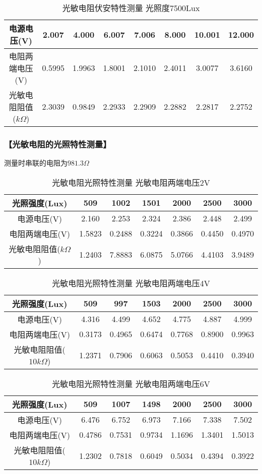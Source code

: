 \documentclass{ctexart}
\let\oldsubsubsection\subsubsection
\renewcommand{\subsubsection}[1]{\oldsubsubsection{\!\!\!\!\!\!【#1】}}
\begin{document}
\begin{table}[H]
  \centering
  \begin{tabular}{|c|c|c|c|c|c|c|c|}
    \hline
    电源电压(V) &2.007&4.000&6.007&7.006&8.000&10.001&12.000\\\hline
    电阻两端电压(V) &0.5995&1.9963&1.8001&2.1010&2.4011&3.0077&3.6160\\\hline
    光敏电阻阻值($k\Omega$)&2.3039&0.9849&2.2933&2.2909&2.2882&2.2817&2.2752 \\\hline
  \end{tabular}
  \caption{光敏电阻伏安特性测量 光照度7500Lux}
\end{table}

\subsubsection{光敏电阻的光照特性测量}

测量时串联的电阻为$981.3\Omega$

\begin{table}[H]
  \centering
  \begin{tabular}{|c|c|c|c|c|c|c|}
    \hline
    光照强度(Lux) &509&1002&1501&2000&2500&3000\\\hline
    电源电压(V) &2.160&2.253&2.324&2.386&2.448&2.499\\\hline
    电阻两端电压(V) &1.5823&0.2488&0.3224&0.3866&0.4450&0.4970\\\hline
    光敏电阻阻值($k\Omega$) & 1.2403&7.8883&6.0875&5.0766&4.4103&3.9489 \\\hline
  \end{tabular}
  \caption{光敏电阻光照特性测量 光敏电阻两端电压2V}
\end{table}

\begin{table}[H]
  \centering
  \begin{tabular}{|c|c|c|c|c|c|c|}
    \hline
    光照强度(Lux) &509&997&1503&2000&2500&3000\\\hline
    电源电压(V) &4.316&4.499&4.652&4.775&4.887&4.999\\\hline
    电阻两端电压(V) &0.3173&0.4965&0.6474&0.7768&0.8900&0.9963\\\hline
    光敏电阻阻值($10 k\Omega$) & 1.2371&0.7906&0.6063&0.5053&0.4410&0.3940\\\hline
  \end{tabular}
  \caption{光敏电阻光照特性测量 光敏电阻两端电压4V}
\end{table}

\begin{table}[H]
  \centering
  \begin{tabular}{|c|c|c|c|c|c|c|}
    \hline
    光照强度(Lux) &509&1007&1498&2000&2500&3000\\\hline
    电源电压(V) &6.476&6.752&6.973&7.166&7.338&7.502\\\hline
    电阻两端电压(V) &0.4786&0.7531&0.9734&1.1696&1.3401&1.5013\\\hline
    光敏电阻阻值($10k\Omega$) & 1.2302&0.7818&0.6049&0.5034&0.4394&0.3922\\\hline
  \end{tabular}
  \caption{光敏电阻光照特性测量 光敏电阻两端电压6V}
\end{table}
\end{document}
